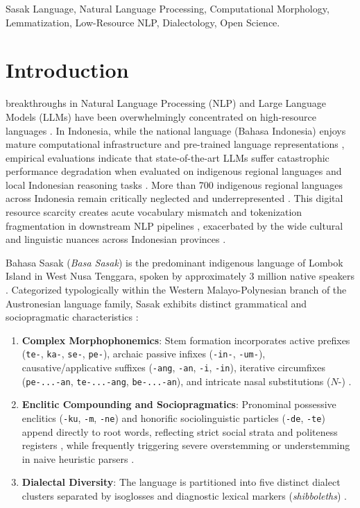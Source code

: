 \documentclass[journal,10pt]{IEEEtran}
\begin{document}
\begin{IEEEkeywords}
Sasak Language, Natural Language Processing, Computational Morphology, Lemmatization, Low-Resource NLP, Dialectology, Open Science.
\end{IEEEkeywords}

\section{Introduction}
 breakthroughs in Natural Language Processing (NLP) and Large Language Models (LLMs) have been overwhelmingly concentrated on high-resource languages \cite{aji2022, ranathunga2023}. In Indonesia, while the national language (Bahasa Indonesia) enjoys mature computational infrastructure and pre-trained language representations \cite{cahyawijaya2021indonlg, koto2021}, empirical evaluations indicate that state-of-the-art LLMs suffer catastrophic performance degradation when evaluated on indigenous regional languages and local Indonesian reasoning tasks \cite{koto2023indommlu}. More than 700 indigenous regional languages across Indonesia remain critically neglected and underrepresented \cite{aji2022, winata2023}. This digital resource scarcity creates acute vocabulary mismatch and tokenization fragmentation in downstream NLP pipelines \cite{cahyawijaya2023}, exacerbated by the wide cultural and linguistic nuances across Indonesian provinces \cite{koto2024indoculture}.

Bahasa Sasak (\textit{Basa Sasak}) is the predominant indigenous language of Lombok Island in West Nusa Tenggara, spoken by approximately 3 million native speakers \cite{hakim2023, balaibahasa2022}. Categorized typologically within the Western Malayo-Polynesian branch of the Austronesian language family, Sasak exhibits distinct grammatical and sociopragmatic characteristics \cite{yaqin2022, hakim2022}:
\begin{enumerate}
    \item \textbf{Complex Morphophonemics}: Stem formation incorporates active prefixes (\texttt{te-}, \texttt{ka-}, \texttt{se-}, \texttt{pe-}), archaic passive infixes (\texttt{-in-}, \texttt{-um-}), causative/applicative suffixes (\texttt{-ang}, \texttt{-an}, \texttt{-i}, \texttt{-in}), iterative circumfixes (\texttt{pe-...-an}, \texttt{te-...-ang}, \texttt{be-...-an}), and intricate nasal substitutions ($N$-) \cite{balaibahasa2022, abidin2024}.
    \item \textbf{Enclitic Compounding and Sociopragmatics}: Pronominal possessive enclitics (\texttt{-ku}, \texttt{-m}, \texttt{-ne}) and honorific sociolinguistic particles (\texttt{-de}, \texttt{-te}) append directly to root words, reflecting strict social strata and politeness registers \cite{yaqin2022}, while frequently triggering severe overstemming or understemming in naive heuristic parsers \cite{abidin2024}.
    \item \textbf{Dialectal Diversity}: The language is partitioned into five distinct dialect clusters separated by isoglosses and diagnostic lexical markers (\textit{shibboleths}) \cite{hakim2023, hakim2022}.
\end{enumerate}
\end{document}
